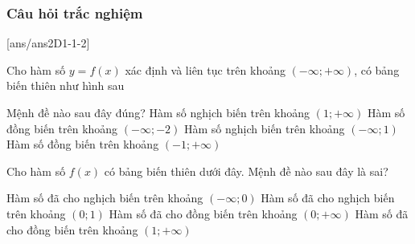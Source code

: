 \subsubsection{Câu hỏi trắc nghiệm}
[ans/ans2D1-1-2]
\begin{ex}%
	Cho hàm số $y=f(x)$ xác định và liên tục trên khoảng $(-\infty;+\infty)$, có bảng biến thiên như hình sau
	\begin{center}
	\end{center}
	Mệnh đề nào sau đây đúng?
	\choice
	{Hàm số nghịch biến trên khoảng $(1;+\infty)$}
	{\True Hàm số đồng biến trên khoảng $(-\infty;-2)$}
	{Hàm số nghịch biến trên khoảng $(-\infty;1)$}
	{Hàm số đồng biến trên khoảng $(-1;+\infty)$}
\end{ex}
\begin{ex}%
	Cho hàm số $f(x)$ có bảng biến thiên dưới đây. Mệnh đề nào sau đây là sai?
	\begin{center}
	\end{center}
	\choice
	{Hàm số đã cho nghịch biến trên khoảng $(-\infty;0)$}
	{Hàm số đã cho nghịch biến trên khoảng $(0;1)$}
	{\True Hàm số đã cho đồng biến trên khoảng $(0;+\infty)$}
	{Hàm số đã cho đồng biến trên khoảng $(1;+\infty)$}
\end{ex}
